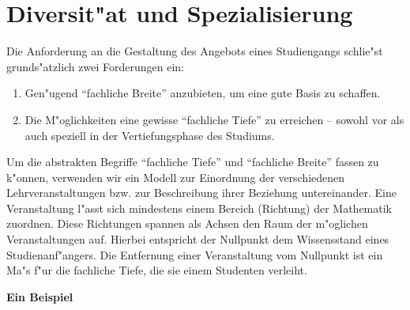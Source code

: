 \section{Diversit"at und Spezialisierung}

Die Anforderung an die Gestaltung des Angebots eines Studiengangs schlie"st grunds"atzlich zwei Forderungen ein: 
\begin{enumerate}
	\item Gen"ugend "`fachliche Breite"' anzubieten, um eine gute Basis zu schaffen.
	\item Die M"oglichkeiten eine gewisse "`fachliche Tiefe"' zu erreichen -- sowohl vor als auch speziell in der Vertiefungsphase des Studiums.
\end{enumerate}

Um die abstrakten Begriffe "`fachliche Tiefe"' und "`fachliche
Breite"' fassen zu k"onnen, verwenden wir ein Modell zur Einordnung
der verschiedenen Lehrveranstaltungen bzw. zur Beschreibung ihrer
Beziehung untereinander.  Eine Veranstaltung l"asst sich mindestens
einem Bereich (Richtung) der Mathematik zuordnen. Diese Richtungen
spannen als Achsen den Raum der m"oglichen Veranstaltungen auf.
Hierbei entspricht der Nullpunkt dem Wissensstand eines Studienanf"angers.
Die Entfernung einer Veranstaltung vom Nullpunkt ist ein Ma"s f"ur
die fachliche Tiefe, die sie einem Studenten verleiht.

\begin{center}
\textbf{Ein Beispiel}\\
\end{center}

